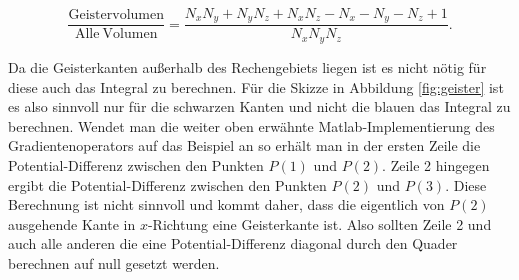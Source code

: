 \begin{equation*}
		\frac{\mathrm{Geistervolumen}}{\mathrm{Alle \: Volumen}} = \frac{N_x N_y + N_y N_z + N_x N_z - N_x - N_y - N_z + 1}{N_x N_y N_z}.
\end{equation*}

Da die Geisterkanten außerhalb des Rechengebiets liegen ist es nicht nötig für diese auch das Integral zu berechnen. Für die Skizze in Abbildung \ref{fig:geister} ist es also sinnvoll nur für die schwarzen Kanten und nicht die blauen das Integral zu berechnen. Wendet man die weiter oben erwähnte Matlab-Implementierung des Gradientenoperators auf das Beispiel an so erhält man in der ersten Zeile die Potential-Differenz zwischen den Punkten $P(1)$ und $P(2)$. Zeile 2 hingegen ergibt die Potential-Differenz zwischen den Punkten $P(2)$ und $P(3)$. Diese Berechnung ist nicht sinnvoll und kommt daher, dass die eigentlich von $P(2)$ ausgehende Kante in $x$-Richtung eine Geisterkante ist. Also sollten Zeile 2 und auch alle anderen die eine Potential-Differenz diagonal durch den Quader berechnen auf null gesetzt werden.


